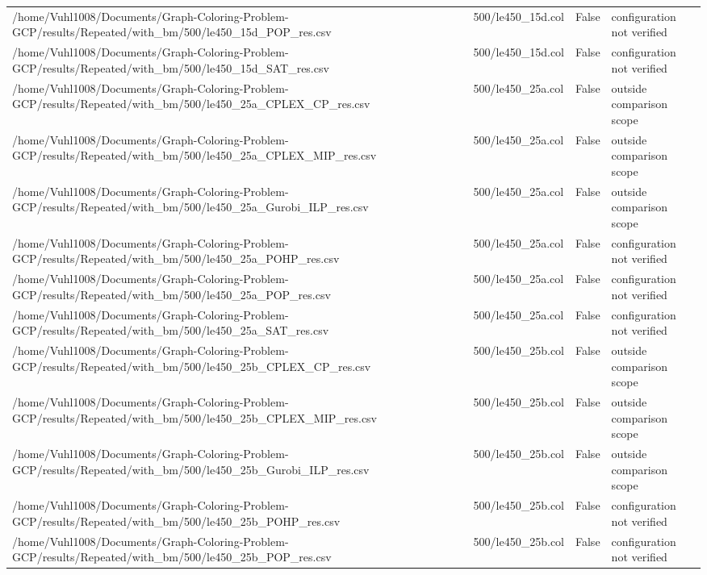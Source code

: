 \begin{table}[htbp]
\begin{tabular}{llll}
/home/Vuhl1008/Documents/Graph-Coloring-Problem-GCP/results/Repeated/with\_bm/500/le450\_15d\_POP\_res.csv & 500/le450\_15d.col & False & configuration not verified \\
/home/Vuhl1008/Documents/Graph-Coloring-Problem-GCP/results/Repeated/with\_bm/500/le450\_15d\_SAT\_res.csv & 500/le450\_15d.col & False & configuration not verified \\
/home/Vuhl1008/Documents/Graph-Coloring-Problem-GCP/results/Repeated/with\_bm/500/le450\_25a\_CPLEX\_CP\_res.csv & 500/le450\_25a.col & False & outside comparison scope \\
/home/Vuhl1008/Documents/Graph-Coloring-Problem-GCP/results/Repeated/with\_bm/500/le450\_25a\_CPLEX\_MIP\_res.csv & 500/le450\_25a.col & False & outside comparison scope \\
/home/Vuhl1008/Documents/Graph-Coloring-Problem-GCP/results/Repeated/with\_bm/500/le450\_25a\_Gurobi\_ILP\_res.csv & 500/le450\_25a.col & False & outside comparison scope \\
/home/Vuhl1008/Documents/Graph-Coloring-Problem-GCP/results/Repeated/with\_bm/500/le450\_25a\_POHP\_res.csv & 500/le450\_25a.col & False & configuration not verified \\
/home/Vuhl1008/Documents/Graph-Coloring-Problem-GCP/results/Repeated/with\_bm/500/le450\_25a\_POP\_res.csv & 500/le450\_25a.col & False & configuration not verified \\
/home/Vuhl1008/Documents/Graph-Coloring-Problem-GCP/results/Repeated/with\_bm/500/le450\_25a\_SAT\_res.csv & 500/le450\_25a.col & False & configuration not verified \\
/home/Vuhl1008/Documents/Graph-Coloring-Problem-GCP/results/Repeated/with\_bm/500/le450\_25b\_CPLEX\_CP\_res.csv & 500/le450\_25b.col & False & outside comparison scope \\
/home/Vuhl1008/Documents/Graph-Coloring-Problem-GCP/results/Repeated/with\_bm/500/le450\_25b\_CPLEX\_MIP\_res.csv & 500/le450\_25b.col & False & outside comparison scope \\
/home/Vuhl1008/Documents/Graph-Coloring-Problem-GCP/results/Repeated/with\_bm/500/le450\_25b\_Gurobi\_ILP\_res.csv & 500/le450\_25b.col & False & outside comparison scope \\
/home/Vuhl1008/Documents/Graph-Coloring-Problem-GCP/results/Repeated/with\_bm/500/le450\_25b\_POHP\_res.csv & 500/le450\_25b.col & False & configuration not verified \\
/home/Vuhl1008/Documents/Graph-Coloring-Problem-GCP/results/Repeated/with\_bm/500/le450\_25b\_POP\_res.csv & 500/le450\_25b.col & False & configuration not verified \\

\end{tabular}
\end{table}
